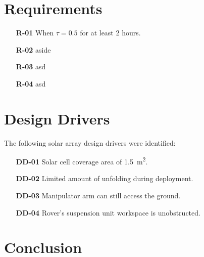 \section{Requirements}
\label{sec:RequirementsAndDesignDrivers:Requirements}

\begin{itemize}
    \item[\textbf{R-01}] When $\tau = 0.5$ for at least 2 hours.
    \item[\textbf{R-02}] aside
    \item[\textbf{R-03}] asd
    \item[\textbf{R-04}] asd
\end{itemize}


\section{Design Drivers}
\label{sec:RequirementsAndDesignDrivers:DesignDrivers}
The following solar array design drivers were identified:

\begin{itemize}
    \item[\textbf{DD-01}] Solar cell coverage area of \SI{1.5}{\square\meter}.
    \item[\textbf{DD-02}] Limited amount of unfolding during deployment.
    \item[\textbf{DD-03}] Manipulator arm can still access the ground.
    \item[\textbf{DD-04}] Rover's suspension unit workspace is unobstructed.
\end{itemize}

\section{Conclusion}
\label{sec:RequirementsAndDesignDrivers:Conclusion}

